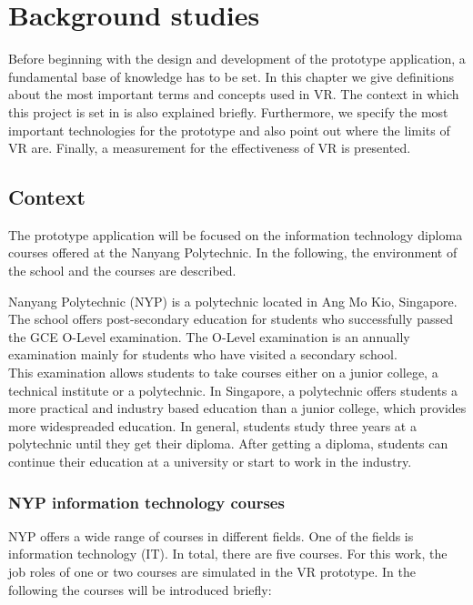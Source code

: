 \chapter{Background studies} \label{stateofarts}
Before beginning with the design and development of the prototype application, a fundamental base of knowledge has to be set. In this chapter we give definitions about the most important terms and concepts used in VR. The context in which this project is set in is also explained briefly. Furthermore, we specify the most important technologies for the prototype and also point out where the limits of VR are. Finally, a measurement for the effectiveness of  VR is presented.

\section{Context}
The prototype application will be focused on the information technology diploma courses offered at the Nanyang Polytechnic. In the following, the environment of the school and the courses are described.

Nanyang Polytechnic (NYP) is a polytechnic located in Ang Mo Kio, Singapore. The school offers post-secondary education for students who successfully passed the GCE O-Level examination. The O-Level examination is an annually examination mainly for students who have visited a secondary school. \cite{aboutOLevel} \\ 
This examination allows students to take courses either on a junior college, a technical institute or a polytechnic. In Singapore, a polytechnic offers students a more practical and industry based education than a junior college, which provides more widespreaded education. In general, students study three years at a polytechnic until they get their diploma. After getting a diploma, students can continue their education at a university or start to work in the industry. \cite{schoolSystem}
\subsection{NYP information technology courses}
NYP offers a wide range of courses in different fields. One of the fields is information technology (IT). In total, there are five courses. For this work, the job roles of one or two courses are simulated in the VR prototype. In the following the courses will be introduced briefly: \cite{nypCourses}

